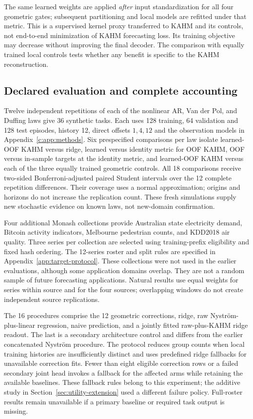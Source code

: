 The same learned weights are applied \emph{after} input standardization
for all four geometric gates; subsequent partitioning and local models
are refitted under that metric. This is a supervised kernel proxy
transferred to KAHM and its controls, not end-to-end minimization of
KAHM forecasting loss. Its training objective may decrease without
improving the final decoder. The comparison with equally trained local
controls tests whether any benefit is specific to the KAHM reconstruction.

\subsection{Declared evaluation and complete accounting}
\label{sec:target-evaluation}

Twelve independent repetitions of each of the nonlinear AR, Van der
Pol, and Duffing laws give 36 synthetic tasks. Each uses 128 training,
64 validation and 128 test episodes, history 12, direct offsets $1,4,12$
and the observation models in Appendix~\ref{c:app:methods}. Six prespecified comparisons per
law isolate learned-OOF KAHM versus ridge, learned versus identity
metric for OOF KAHM, OOF versus in-sample targets at the identity metric,
and learned-OOF KAHM versus each of the three equally trained geometric
controls. All 18 comparisons receive two-sided Bonferroni-adjusted
paired Student intervals over the 12 complete repetition differences.
Their coverage uses a normal approximation; origins and horizons do not
increase the replication count. These fresh simulations supply new
stochastic evidence on known laws, not new-domain confirmation.

Four additional Monash collections \citep{Godahewa2021Monash} provide
Australian state electricity demand, Bitcoin activity indicators,
Melbourne pedestrian counts, and KDD2018 air quality. Three series per
collection are selected using training-prefix eligibility and fixed hash ordering. The 12-series roster and split rules are specified in
Appendix~\ref{app:target-protocol}. These collections were not used in the earlier evaluations, although
some application domains overlap. They are not a
random sample of future forecasting applications. Natural results use
equal weights for series within source and for the four sources;
overlapping windows do not create independent source replications.

The 16 procedures comprise the 12 geometric corrections, ridge,
raw Nystr\"om-plus-linear regression, naive prediction, and a jointly
fitted raw-plus-KAHM ridge readout. The last is a secondary architecture
control and differs from the earlier concatenated Nystr\"om procedure.
The protocol reduces group counts when local training histories are
insufficiently distinct and uses predefined ridge fallbacks for
unavailable correction fits. Fewer than eight eligible correction rows
or a failed secondary joint head invokes a fallback for the affected
arms while retaining the available baselines. These fallback rules belong to this experiment; the additive study in
Section~\ref{sec:utility-extension} used a different failure policy.
Full-roster results remain unavailable if a primary baseline or required
task output is missing.

